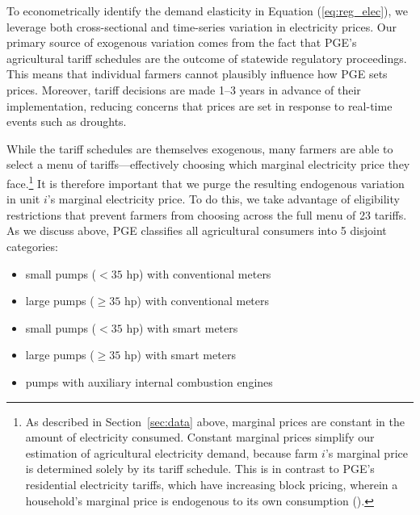 To econometrically identify the demand elasticity in Equation (\ref{eq:reg_elec}), we leverage both cross-sectional and time-series variation in electricity prices. Our primary source of exogenous variation  comes from the fact that PGE's agricultural tariff schedules are the outcome of statewide regulatory proceedings. This means that individual farmers cannot plausibly influence how PGE sets prices. Moreover, tariff decisions are made 1--3 years in advance of their implementation, reducing concerns that prices are set in response to real-time events such as droughts.

While the tariff schedules are themselves exogenous, many farmers are able to select a menu of tariffs---effectively choosing which marginal electricity price they face.\footnote{As described in Section~\ref{sec:data} above, marginal prices are constant in the amount of electricity consumed. Constant marginal prices simplify our estimation of agricultural electricity demand, because farm $i$'s marginal price is determined solely by its tariff schedule. This is in contrast to PGE's residential electricity tariffs, which have increasing block pricing, wherein a household's marginal price is endogenous to its own consumption (\textcite{ito2014}).} It is therefore important that we purge the resulting endogenous variation in unit $i$'s marginal electricity price. To do this, we take advantage of eligibility restrictions that prevent farmers from choosing across the full menu of 23 tariffs.%
As we discuss above, PGE classifies all agricultural consumers into 5 disjoint categories: 
\begin{itemize}
\setlength\itemsep{0em}
\item small pumps ($<35$ hp) with conventional meters
\item large pumps ($\ge35$ hp) with conventional meters
\item small pumps ($<35$ hp) with smart meters
\item large pumps ($\ge35$ hp) with smart meters
\item pumps with auxiliary internal combustion engines
\end{itemize}
\noindent
